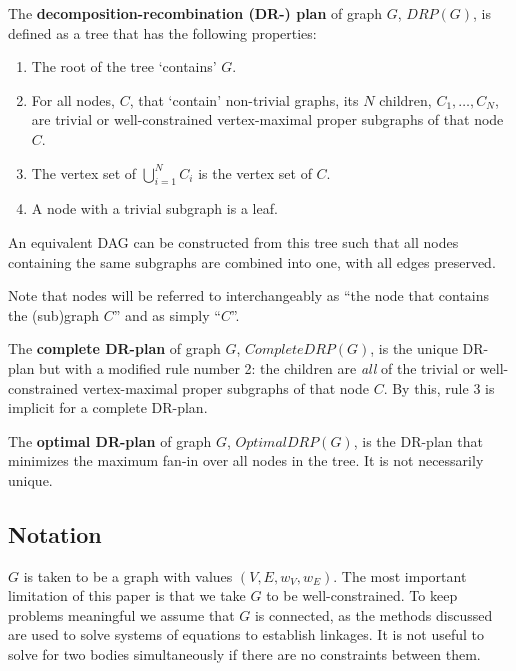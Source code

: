 \begin{definition}
    The \textbf{decomposition-recombination (DR-) plan} of graph $G$, $DRP(G)$, is defined as a tree that has the following properties:
    \begin{enumerate}
        \item The root of the tree `contains' $G$.
        \item For all nodes, $C$, that `contain' non-trivial graphs, its $N$ children, $C_1, \ldots, C_N$, are trivial or well-constrained vertex-maximal proper subgraphs of that node $C$.
        \item The vertex set of $\bigcup_{i=1}^N{C_i}$ is the vertex set of $C$.
        \item A node with a trivial subgraph is a leaf.
    \end{enumerate}


    An equivalent DAG can be constructed from this tree such that all nodes containing the same subgraphs are combined into one, with all edges preserved.

    Note that nodes will be referred to interchangeably as ``the node that contains the (sub)graph $C$'' and as simply ``$C$''.
\end{definition}

\begin{definition}
    The \textbf{complete DR-plan} of graph $G$, $CompleteDRP(G)$, is the unique DR-plan but with a modified rule number 2: the children are \emph{all} of the trivial or well-constrained vertex-maximal proper subgraphs of that node $C$. By this, rule 3 is implicit for a complete DR-plan.
\end{definition}

\begin{definition}
    The \textbf{optimal DR-plan} of graph $G$, $OptimalDRP(G)$, is the DR-plan that minimizes the maximum fan-in over all nodes in the tree. It is not necessarily unique.
\end{definition}


\subsection{Notation}

$G$ is taken to be a graph with values $(V,E,w_V,w_E)$. The most important limitation of this paper is that we take $G$ to be well-constrained.
 To keep problems meaningful we assume that $G$ is connected, as the methods discussed are used to solve systems of equations to establish linkages. It is not useful to solve for two bodies simultaneously if there are no constraints between them.

